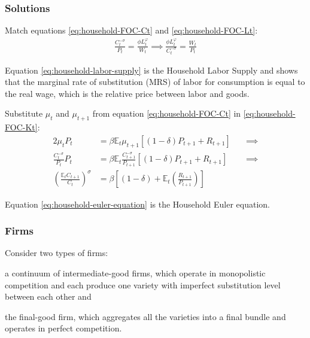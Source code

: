 \documentclass[
thesis.tex
]{subfiles}
\begin{document}
	\subsubsection*{Solutions}
	
	Match equations \ref{eq:household-FOC-Ct} and \ref{eq:household-FOC-Lt}:
	\begin{align}
		\label{eq:household-labor-supply}
		\frac{C_t^{-\sigma}}{P_t} = \frac{\phi L_t^{\varphi}}{W_t} \implies 
		\frac{\phi L_t^{\varphi}}{C_t^{-\sigma}} = \frac{W_t}{P_t}
	\end{align}
	
	Equation \ref{eq:household-labor-supply} is the Household Labor Supply and shows that the marginal rate of substitution (MRS) of labor for consumption is equal to the real wage, which is the relative price between labor and goods.
	
	Substitute $\mu_t$ and $\mu_{t+1}$ from equation \ref{eq:household-FOC-Ct} in \ref{eq:household-FOC-Kt}:
	\begin{alignat}{2}
		\mu_t P_t & = \beta \mathbb{E}_t \mu_{t+1} [(1-\delta) P_{t+1} + R_{t+1}] \quad &\implies \nonumber \\
		\frac{C_t^{-\sigma}}{P_t} P_t & = \beta \mathbb{E}_t \frac{C_{t+1}^{-\sigma}}{P_{t+1}} [(1-\delta) P_{t+1} + R_{t+1}] &\implies \nonumber \\
		\left( \frac{\mathbb{E}_t C_{t+1}}{C_t} \right)^\sigma & = \beta \left[ (1-\delta) + \mathbb{E}_t \left(\frac{R_{t+1}}{P_{t+1}}\right) \right] \label{eq:household-euler-equation}
	\end{alignat}
	
	Equation \ref{eq:household-euler-equation} is the Household Euler equation.
	
	
	\subsubsection*{Firms}
	
	Consider two types of firms: 
	\begin{enumerate*}[label=(\arabic*)]
		\item a continuum of intermediate-good firms, which operate in monopolistic competition and each produce one variety with imperfect substitution level between each other and
		
		\item the final-good firm, which aggregates all the varieties into a final bundle and operates in perfect competition.
	\end{enumerate*}
	
\end{document}
